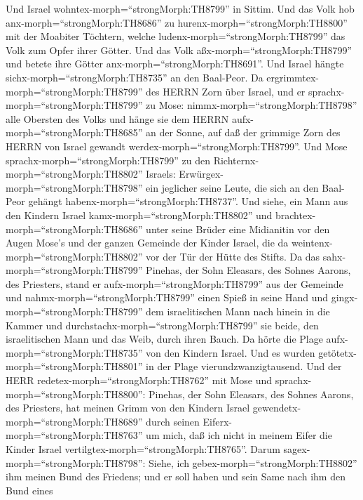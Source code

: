  Und Israel wohntex-morph=``strongMorph:TH8799'' in Sittim.
Und das Volk hob anx-morph=``strongMorph:TH8686'' zu
hurenx-morph=``strongMorph:TH8800'' mit der Moabiter Töchtern,
 welche ludenx-morph=``strongMorph:TH8799'' das Volk zum
Opfer ihrer Götter. Und das Volk aßx-morph=``strongMorph:TH8799'' und
betete ihre Götter anx-morph=``strongMorph:TH8691''.  Und
Israel hängte sichx-morph=``strongMorph:TH8735'' an den Baal-Peor. Da
ergrimmtex-morph=``strongMorph:TH8799'' des HERRN Zorn über Israel,
 und er sprachx-morph=``strongMorph:TH8799'' zu Mose:
nimmx-morph=``strongMorph:TH8798'' alle Obersten des Volks und hänge sie
dem HERRN aufx-morph=``strongMorph:TH8685'' an der Sonne, auf daß der
grimmige Zorn des HERRN von Israel gewandt
werdex-morph=``strongMorph:TH8799''.  Und Mose
sprachx-morph=``strongMorph:TH8799'' zu den
Richternx-morph=``strongMorph:TH8802'' Israels:
Erwürgex-morph=``strongMorph:TH8798'' ein jeglicher seine Leute, die
sich an den Baal-Peor gehängt habenx-morph=``strongMorph:TH8737''.
 Und siehe, ein Mann aus den Kindern Israel
kamx-morph=``strongMorph:TH8802'' und
brachtex-morph=``strongMorph:TH8686'' unter seine Brüder eine Midianitin
vor den Augen Mose's und der ganzen Gemeinde der Kinder Israel, die da
weintenx-morph=``strongMorph:TH8802'' vor der Tür der Hütte des Stifts.
 Da das sahx-morph=``strongMorph:TH8799'' Pinehas, der Sohn
Eleasars, des Sohnes Aarons, des Priesters, stand er
aufx-morph=``strongMorph:TH8799'' aus der Gemeinde und
nahmx-morph=``strongMorph:TH8799'' einen Spieß in seine Hand
 und gingx-morph=``strongMorph:TH8799'' dem israelitischen
Mann nach hinein in die Kammer und
durchstachx-morph=``strongMorph:TH8799'' sie beide, den israelitischen
Mann und das Weib, durch ihren Bauch. Da hörte die Plage
aufx-morph=``strongMorph:TH8735'' von den Kindern Israel. 
Und es wurden getötetx-morph=``strongMorph:TH8801'' in der Plage
vierundzwanzigtausend.  Und der HERR
redetex-morph=``strongMorph:TH8762'' mit Mose und
sprachx-morph=``strongMorph:TH8800'':  Pinehas, der Sohn
Eleasars, des Sohnes Aarons, des Priesters, hat meinen Grimm von den
Kindern Israel gewendetx-morph=``strongMorph:TH8689'' durch seinen
Eiferx-morph=``strongMorph:TH8763'' um mich, daß ich nicht in meinem
Eifer die Kinder Israel vertilgtex-morph=``strongMorph:TH8765''.
 Darum sagex-morph=``strongMorph:TH8798'': Siehe, ich
gebex-morph=``strongMorph:TH8802'' ihm meinen Bund des Friedens;
 und er soll haben und sein Same nach ihm den Bund eines
